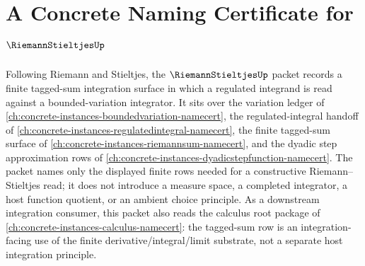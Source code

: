 \chapter{A Concrete Naming Certificate for $\RiemannStieltjesUp$}
\label{ch:concrete-instances-riemannstieltjes-namecert}

Following Riemann and Stieltjes, the $\RiemannStieltjesUp$ packet records a finite tagged-sum integration surface in which a regulated integrand is read against a bounded-variation integrator. It sits over the variation ledger of \autoref{ch:concrete-instances-boundedvariation-namecert}, the regulated-integral handoff of \autoref{ch:concrete-instances-regulatedintegral-namecert}, the finite tagged-sum surface of \autoref{ch:concrete-instances-riemannsum-namecert}, and the dyadic step approximation rows of \autoref{ch:concrete-instances-dyadicstepfunction-namecert}. The packet names only the displayed finite rows needed for a constructive Riemann--Stieltjes read; it does not introduce a measure space, a completed integrator, a host function quotient, or an ambient choice principle. As a downstream integration consumer, this packet also reads the calculus root package of \autoref{ch:concrete-instances-calculus-namecert}: the tagged-sum row is an integration-facing use of the finite derivative/integral/limit substrate, not a separate host integration principle.

